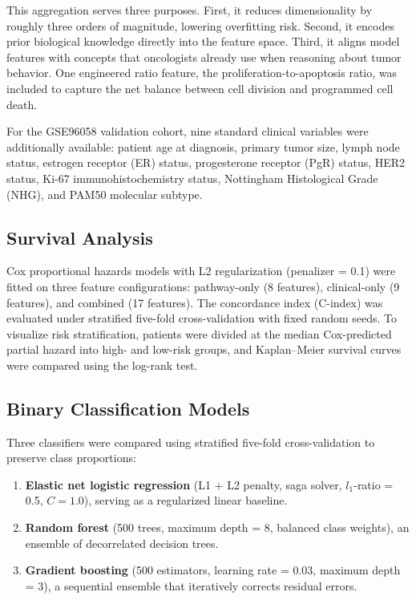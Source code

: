 \documentclass[11pt]{article}
\begin{document}
This aggregation serves three purposes. First, it reduces dimensionality by roughly three orders of magnitude, lowering overfitting risk. Second, it encodes prior biological knowledge directly into the feature space. Third, it aligns model features with concepts that oncologists already use when reasoning about tumor behavior. One engineered ratio feature, the proliferation-to-apoptosis ratio, was included to capture the net balance between cell division and programmed cell death.

For the GSE96058 validation cohort, nine standard clinical variables were additionally available: patient age at diagnosis, primary tumor size, lymph node status, estrogen receptor (ER) status, progesterone receptor (PgR) status, HER2 status, Ki-67 immunohistochemistry status, Nottingham Histological Grade (NHG), and PAM50 molecular subtype.

\subsection{Survival Analysis}

Cox proportional hazards models \citep{cox1972} with L2 regularization (penalizer = 0.1) were fitted on three feature configurations: pathway-only (8 features), clinical-only (9 features), and combined (17 features). The concordance index (C-index) was evaluated under stratified five-fold cross-validation with fixed random seeds. To visualize risk stratification, patients were divided at the median Cox-predicted partial hazard into high- and low-risk groups, and Kaplan--Meier survival curves were compared using the log-rank test.

\subsection{Binary Classification Models}

Three classifiers were compared using stratified five-fold cross-validation to preserve class proportions:

\begin{enumerate}
    \item \textbf{Elastic net logistic regression} (L1 + L2 penalty, saga solver, $l_1$-ratio = 0.5, $C = 1.0$), serving as a regularized linear baseline.
    \item \textbf{Random forest} (500 trees, maximum depth = 8, balanced class weights), an ensemble of decorrelated decision trees.
    \item \textbf{Gradient boosting} (500 estimators, learning rate = 0.03, maximum depth = 3), a sequential ensemble that iteratively corrects residual errors.
\end{enumerate}
\end{document}
